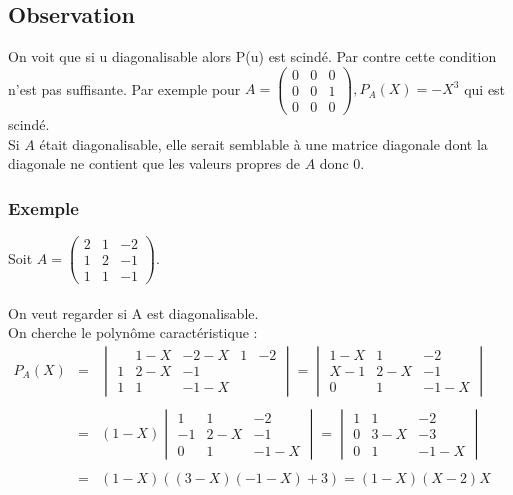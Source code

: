 \documentclass[a4paper,10pt]{book} %
\begin{document}
\subsection{Observation}
On voit que si u diagonalisable alors P(u) est scindé. Par contre cette condition n'est pas suffisante. Par exemple pour $A=\begin{pmatrix}
0&0&0\\0&0&1\\0&0&0
\end{pmatrix}, P_A(X)=-X^3$ qui est scindé.\\

Si $A$ était diagonalisable, elle serait semblable à une matrice diagonale dont la diagonale ne contient que les valeurs propres de $A$ donc 0.

\subsubsection{Exemple}
Soit $A=\begin{pmatrix}
2&1&-2\\1&2&-1\\1&1&-1
\end{pmatrix}$.\\\\

On veut regarder si A est diagonalisable.\\
On cherche le polynôme caractéristique :\\

$\begin{array}{rcl}P_A(X)&=&\begin{vmatrix}&1-X&-
2-X&1&-2\\1&2-X&-1\\1&1&-1-X
\end{vmatrix}=\begin{vmatrix}
1-X&1&-2\\X-1&2-X&-1\\0&1&-1-X
\end{vmatrix}\\\\
&=&(1-X)\begin{vmatrix}
1&1&-2\\-1&2-X&-1\\0&1&-1-X
\end{vmatrix}=\begin{vmatrix}
1&1&-2\\0&3-X&-3\\0&1&-1-X
\end{vmatrix}\\\\
&=&(1-X)((3-X)(-1-X)+3)=(1-X)(X-2)X\end{array}$\\
\end{document}

